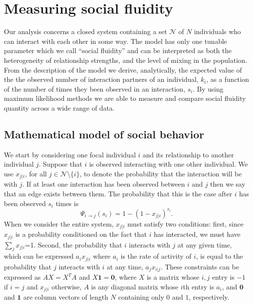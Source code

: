 \documentclass[twocolumn,8pt]{article}
\begin{document}
\section{Measuring social fluidity}
Our analysis concerns a closed system containing a set $\mathcal{N}$ of $N$ individuals who can interact with each other in some way. The model has only one tunable parameter which we call ``social fluidity'' and can be interpreted as both the heterogeneity of relationship strengths, and the level of mixing in the population. From the description of the model we derive, analytically, the expected value of the the observed number of interaction partners of an individual, $k_{i}$, as a function of the number of times they been observed in an interaction, $s_{i}$. By using maximum likelihood methods we are able to measure and compare social fluidity quantity across a wide range of data.
 
\subsection{Mathematical model of social behavior}
\label{social_mixing}
We start by considering one focal individual $i$ and its relationship to another individual $j$. Suppose that $i$ is observed interacting with one other individual. We use $x_{j|i}$, for all $j\in \mathcal{N}\setminus\{i\}$, to denote the probability that the interaction will be with $j$. If at least one interaction has been observed between $i$ and $j$ then we say that an edge exists between them. The probability that this is the case after $i$ has been observed $s_{i}$ times is
\begin{equation}
\label{i_to_j}
\Psi_{i \rightarrow j}(s_{i})=1-(1-x_{j|i})^{s_{i}}.
\end{equation}
When we consider the entire system, $x_{j|i}$ must satisfy two conditions: first, since  $x_{j|i}$ is a probability conditioned on the fact that $i$ has interacted, we must have $\sum_{j}x_{j|i}$=1. Second, the probability that $i$ interacts with $j$ at any given time, which can be expressed $a_{i}x_{j|i}$ where $a_{i}$ is the rate of activity of $i$, is equal to the probability that $j$ interacts with $i$ at any time, $a_{j}x_{i|j}$. These constraints can be expressed as $AX=X^{T}A$ and $X\textbf{1}=\textbf{0}$, where $X$ is a matrix whose $i,j$ entry is $-1$ if $i=j$ and $x_{j|i}$ otherwise, $A$ is any diagonal matrix whose $i$th entry is $a_{i}$, and $\textbf{0}$ and $\textbf{1}$ are column vectors of length $N$ containing only $0$ and $1$, respectively.
\end{document}
